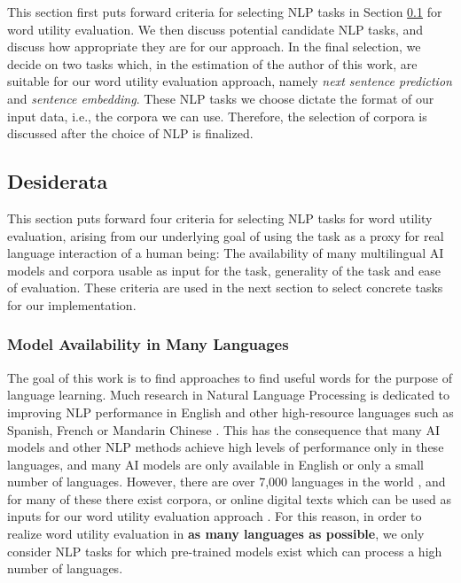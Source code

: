 This section first puts forward criteria for selecting NLP tasks in Section \ref{sec:nlp-tasks-desiderata} for word utility evaluation.
We then discuss potential candidate NLP tasks, and discuss how appropriate they are for our approach.
In the final selection, we decide on two tasks which, in the estimation of the author of this work, are suitable for our word utility evaluation approach, namely \textit{next sentence prediction} and \textit{sentence embedding}.
These NLP tasks we choose dictate the format of our input data, i.e., the corpora we can use.
Therefore, the selection of corpora is discussed after the choice of NLP is finalized.

\subsection{Desiderata} \label{sec:nlp-tasks-desiderata}

This section puts forward four criteria for selecting NLP tasks for word utility evaluation, arising from our underlying goal of using the task as a proxy for real language interaction of a human being:
The availability of many multilingual AI models and corpora usable as input for the task, generality of the task and ease of evaluation.
These criteria are used in the next section to select concrete tasks for our implementation.

\subsubsection{Model Availability in Many Languages}
The goal of this work is to find approaches to find useful words for the purpose of language learning.
Much research in Natural Language Processing is dedicated to improving NLP performance in English and other high-resource languages such as Spanish, French or Mandarin Chinese .
This has the consequence that many AI models and other NLP methods achieve high levels of performance only in these languages, and many AI models are only available in English or only a small number of languages.
However, there are over 7,000 languages in the world , and for many of these there exist corpora, or online digital texts which can be used as inputs for our word utility evaluation approach .
For this reason, in order to realize word utility evaluation in \textbf{as many languages as possible}, we only consider NLP tasks for which pre-trained models exist which can process a high number of languages.

